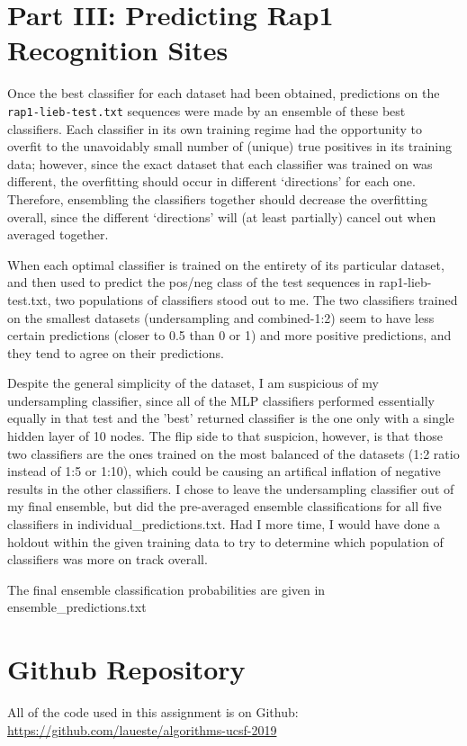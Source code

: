 \documentclass[12pt]{article}
\begin{document}
\section*{Part III: Predicting Rap1 Recognition Sites}
Once the best classifier for each dataset had been obtained, predictions on the \verb|rap1-lieb-test.txt| sequences were made by an ensemble of these best classifiers. Each classifier in its own training regime had the opportunity to overfit to the unavoidably small number of (unique) true positives in its training data; however, since the exact dataset that each classifier was trained on was different, the overfitting should occur in different `directions' for each one. Therefore, ensembling the classifiers together should decrease the overfitting overall, since the different `directions' will (at least partially) cancel out when averaged together.
\par When each optimal classifier is trained on the entirety of its particular dataset, and then used to predict the pos/neg class of the test sequences in rap1-lieb-test.txt, two populations of classifiers stood out to me. The two classifiers trained on the smallest datasets (undersampling and combined-1:2) seem to have less certain predictions (closer to 0.5 than 0 or 1) and more positive predictions, and they tend to agree on their predictions. 
\par Despite the general simplicity of the dataset, I am suspicious of my undersampling classifier, since all of the MLP classifiers performed essentially equally in that test and the 'best' returned classifier is the one only with a single hidden layer of 10 nodes. The flip side to that suspicion, however, is that those two classifiers are the ones trained on the most balanced of the datasets (1:2 ratio instead of 1:5 or 1:10), which could be causing an artifical inflation of negative results in the other classifiers. I chose to leave the undersampling classifier out of my final ensemble, but did the pre-averaged ensemble classifications for all five classifiers in individual_predictions.txt. Had I more time, I would have done a holdout within the given training data to try to determine which population of classifiers was more on track overall. 
\par The final ensemble classification probabilities are given in ensemble_predictions.txt
\section{Github Repository}
All of the code used in this assignment is on Github: \url{https://github.com/laueste/algorithms-ucsf-2019}
\end{document}
